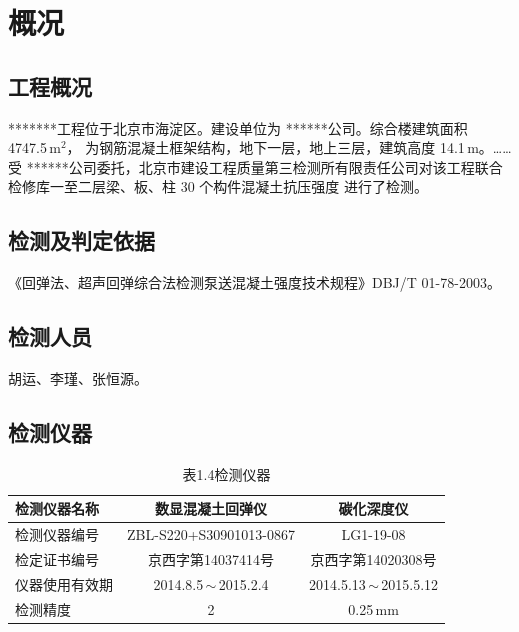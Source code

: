 \documentclass[UTF8, zihao=-4, a4paper]{ctexart}
\newcommand{\projname}{*******工程}
\newcommand{\client}{******公司}
\newcommand{\issuer}{北京市建设工程质量第三检测所有限责任公司}
\begin{document}

\section{概况}

\subsection{工程概况}
\projname 位于北京市海淀区。建设单位为 \client 。综合楼建筑面积 4747.5\,m$^2$，
为钢筋混凝土框架结构，地下一层，地上三层，建筑高度 14.1\,m。\ldots\ldots
受 \client 委托，\issuer 对该工程联合检修库一至二层梁、板、柱 30 个构件混凝土抗压强度
进行了检测。

\subsection{检测及判定依据}
《回弹法、超声回弹综合法检测泵送混凝土强度技术规程》DBJ/T 01-78-2003。

\subsection{检测人员}
胡运、李瑾、张恒源。

\subsection{检测仪器}
\begin{table}[h]\centering
\caption*{\songti 表1.4\quad 检测仪器}
\begin{tabular}{|l|c|c|}
\hline
检测仪器名称   & 数显混凝土回弹仪          & 碳化深度仪          \\\hline
检测仪器编号   & ZBL-S220+S30901013-0867 & LG1-19-08          \\\hline
检定证书编号   & 京西字第14037414号       & 京西字第14020308号  \\\hline
仪器使用有效期 & 2014.8.5\,$\sim$\,2015.2.4 & 2014.5.13\,$\sim$\,2015.5.12 \\\hline
检测精度       & 2                       & 0.25\,mm           \\\hline
\end{tabular}
\end{table}
\end{document}
